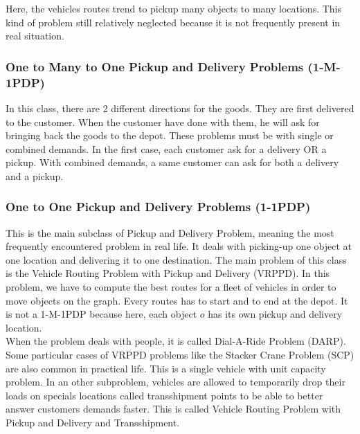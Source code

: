 \documentclass[a4paper,10pt]{article}
\begin{document}
\begin{multicols}{2}
Here, the vehicles routes trend to pickup many objects to many locations. This kind of problem still relatively neglected because it is not frequently present in real situation.\\ %

\subsubsection{One to Many to One Pickup and Delivery Problems (1-M-1PDP) }

In this class, there are 2 different directions for the goods. They are first delivered to the customer. When the customer have done with them, he will ask for bringing back the goods to the depot. These problems must be with single or combined demands. In the first case, each customer ask for a delivery OR a pickup. With combined demands, a same customer can ask for both a delivery and a pickup.\\

\subsubsection{One to One Pickup and Delivery Problems (1-1PDP) }

This is the main subclass of Pickup and Delivery Problem, meaning the most frequently encountered problem in real life. It deals with picking-up one object at one location and delivering it to one destination. The main problem of this class is the Vehicle Routing Problem with Pickup and Delivery (VRPPD). In this problem, we have to compute the best routes for a fleet of vehicles in order to move objects on the graph. Every routes has to start and to end at the depot. It is not a 1-M-1PDP because here, each object $o$ has its own pickup and delivery location.\\%

When the problem deals with people, it is called Dial-A-Ride Problem (DARP). Some particular cases of VRPPD problems like the Stacker Crane Problem (SCP) are also common in practical life. This is a single vehicle with unit capacity problem. In an other subproblem, vehicles are allowed to temporarily drop their loads on specials locations called transshipment points to be able to better answer customers demands faster. This is called Vehicle Routing Problem with Pickup and Delivery and Transshipment.\\


\end{multicols}
\end{document}
